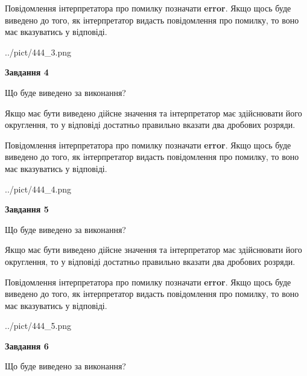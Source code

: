\documentclass[12pt, ukrainian]{article}
\begin{document}
{\begin {Large}
Повідомлення інтерпретатора про помилку позначати \textbf{error}.
Якщо щось буде виведено до того, як інтерпретатор видасть повідомлення про помилку, 
то воно має вказуватись у відповіді. \par

\begin{center}
	{../pict/444_3.png}
\end{center}
\newpage

{\begin {center}\textbf{Завдання 4}\end {center}}\par
Що буде виведено за виконання? \par

Якщо має бути виведено дійсне значення та інтерпретатор має здійснювати його округлення, 
то у відповіді достатньо правильно вказати два дробових розряди.

Повідомлення інтерпретатора про помилку позначати \textbf{error}.
Якщо щось буде виведено до того, як інтерпретатор видасть повідомлення про помилку, 
то воно має вказуватись у відповіді. \par

\begin{center}
	{../pict/444_4.png}
\end{center}
\newpage

{\begin {center}\textbf{Завдання 5}\end {center}}\par
Що буде виведено за виконання? \par

Якщо має бути виведено дійсне значення та інтерпретатор має здійснювати його округлення, 
то у відповіді достатньо правильно вказати два дробових розряди.

Повідомлення інтерпретатора про помилку позначати \textbf{error}.
Якщо щось буде виведено до того, як інтерпретатор видасть повідомлення про помилку, 
то воно має вказуватись у відповіді. \par

\begin{center}
	{../pict/444_5.png}
\end{center}
\newpage

{\begin {center}\textbf{Завдання 6}\end {center}}\par
Що буде виведено за виконання? \par


\end{Large}}
\end{document}
